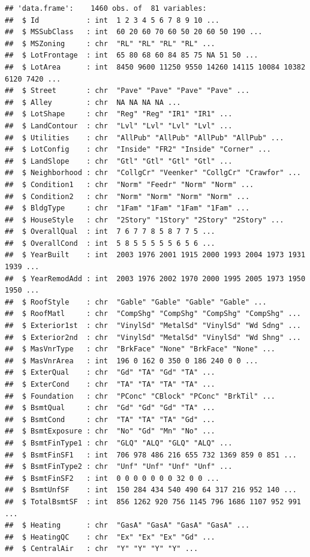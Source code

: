 \documentclass[]{article}
\begin{document}
\begin{verbatim}
## 'data.frame':    1460 obs. of  81 variables:
##  $ Id           : int  1 2 3 4 5 6 7 8 9 10 ...
##  $ MSSubClass   : int  60 20 60 70 60 50 20 60 50 190 ...
##  $ MSZoning     : chr  "RL" "RL" "RL" "RL" ...
##  $ LotFrontage  : int  65 80 68 60 84 85 75 NA 51 50 ...
##  $ LotArea      : int  8450 9600 11250 9550 14260 14115 10084 10382 6120 7420 ...
##  $ Street       : chr  "Pave" "Pave" "Pave" "Pave" ...
##  $ Alley        : chr  NA NA NA NA ...
##  $ LotShape     : chr  "Reg" "Reg" "IR1" "IR1" ...
##  $ LandContour  : chr  "Lvl" "Lvl" "Lvl" "Lvl" ...
##  $ Utilities    : chr  "AllPub" "AllPub" "AllPub" "AllPub" ...
##  $ LotConfig    : chr  "Inside" "FR2" "Inside" "Corner" ...
##  $ LandSlope    : chr  "Gtl" "Gtl" "Gtl" "Gtl" ...
##  $ Neighborhood : chr  "CollgCr" "Veenker" "CollgCr" "Crawfor" ...
##  $ Condition1   : chr  "Norm" "Feedr" "Norm" "Norm" ...
##  $ Condition2   : chr  "Norm" "Norm" "Norm" "Norm" ...
##  $ BldgType     : chr  "1Fam" "1Fam" "1Fam" "1Fam" ...
##  $ HouseStyle   : chr  "2Story" "1Story" "2Story" "2Story" ...
##  $ OverallQual  : int  7 6 7 7 8 5 8 7 7 5 ...
##  $ OverallCond  : int  5 8 5 5 5 5 5 6 5 6 ...
##  $ YearBuilt    : int  2003 1976 2001 1915 2000 1993 2004 1973 1931 1939 ...
##  $ YearRemodAdd : int  2003 1976 2002 1970 2000 1995 2005 1973 1950 1950 ...
##  $ RoofStyle    : chr  "Gable" "Gable" "Gable" "Gable" ...
##  $ RoofMatl     : chr  "CompShg" "CompShg" "CompShg" "CompShg" ...
##  $ Exterior1st  : chr  "VinylSd" "MetalSd" "VinylSd" "Wd Sdng" ...
##  $ Exterior2nd  : chr  "VinylSd" "MetalSd" "VinylSd" "Wd Shng" ...
##  $ MasVnrType   : chr  "BrkFace" "None" "BrkFace" "None" ...
##  $ MasVnrArea   : int  196 0 162 0 350 0 186 240 0 0 ...
##  $ ExterQual    : chr  "Gd" "TA" "Gd" "TA" ...
##  $ ExterCond    : chr  "TA" "TA" "TA" "TA" ...
##  $ Foundation   : chr  "PConc" "CBlock" "PConc" "BrkTil" ...
##  $ BsmtQual     : chr  "Gd" "Gd" "Gd" "TA" ...
##  $ BsmtCond     : chr  "TA" "TA" "TA" "Gd" ...
##  $ BsmtExposure : chr  "No" "Gd" "Mn" "No" ...
##  $ BsmtFinType1 : chr  "GLQ" "ALQ" "GLQ" "ALQ" ...
##  $ BsmtFinSF1   : int  706 978 486 216 655 732 1369 859 0 851 ...
##  $ BsmtFinType2 : chr  "Unf" "Unf" "Unf" "Unf" ...
##  $ BsmtFinSF2   : int  0 0 0 0 0 0 0 32 0 0 ...
##  $ BsmtUnfSF    : int  150 284 434 540 490 64 317 216 952 140 ...
##  $ TotalBsmtSF  : int  856 1262 920 756 1145 796 1686 1107 952 991 ...
##  $ Heating      : chr  "GasA" "GasA" "GasA" "GasA" ...
##  $ HeatingQC    : chr  "Ex" "Ex" "Ex" "Gd" ...
##  $ CentralAir   : chr  "Y" "Y" "Y" "Y" ...

\end{verbatim}
\end{document}
